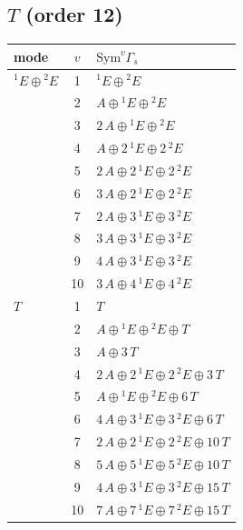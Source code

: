 \documentclass[11pt]{article}
\begin{document}
\subsection*{$T$ \quad (order 12)}
\begin{longtable}{l c p{}}
\hline mode & $v$ & $\mathrm{Sym}^v\Gamma_s$\\ \hline\endhead
${}^{1}E\oplus {}^{2}E$ & 1 & ${}^{1}E\oplus {}^{2}E$\\
 & 2 & $A\oplus {}^{1}E\oplus {}^{2}E$\\
 & 3 & $2\,A\oplus {}^{1}E\oplus {}^{2}E$\\
 & 4 & $A\oplus 2\,{}^{1}E\oplus 2\,{}^{2}E$\\
 & 5 & $2\,A\oplus 2\,{}^{1}E\oplus 2\,{}^{2}E$\\
 & 6 & $3\,A\oplus 2\,{}^{1}E\oplus 2\,{}^{2}E$\\
 & 7 & $2\,A\oplus 3\,{}^{1}E\oplus 3\,{}^{2}E$\\
 & 8 & $3\,A\oplus 3\,{}^{1}E\oplus 3\,{}^{2}E$\\
 & 9 & $4\,A\oplus 3\,{}^{1}E\oplus 3\,{}^{2}E$\\
 & 10 & $3\,A\oplus 4\,{}^{1}E\oplus 4\,{}^{2}E$\\
\hline
$T$ & 1 & $T$\\
 & 2 & $A\oplus {}^{1}E\oplus {}^{2}E\oplus T$\\
 & 3 & $A\oplus 3\,T$\\
 & 4 & $2\,A\oplus 2\,{}^{1}E\oplus 2\,{}^{2}E\oplus 3\,T$\\
 & 5 & $A\oplus {}^{1}E\oplus {}^{2}E\oplus 6\,T$\\
 & 6 & $4\,A\oplus 3\,{}^{1}E\oplus 3\,{}^{2}E\oplus 6\,T$\\
 & 7 & $2\,A\oplus 2\,{}^{1}E\oplus 2\,{}^{2}E\oplus 10\,T$\\
 & 8 & $5\,A\oplus 5\,{}^{1}E\oplus 5\,{}^{2}E\oplus 10\,T$\\
 & 9 & $4\,A\oplus 3\,{}^{1}E\oplus 3\,{}^{2}E\oplus 15\,T$\\
 & 10 & $7\,A\oplus 7\,{}^{1}E\oplus 7\,{}^{2}E\oplus 15\,T$\\
\hline
\end{longtable}
\end{document}
